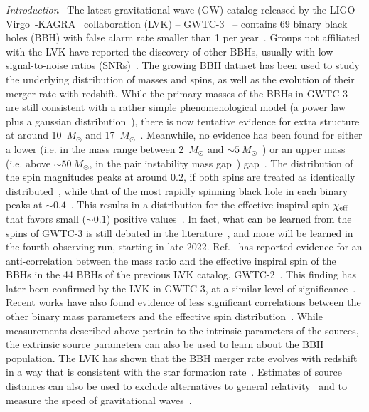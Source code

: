 \documentclass[floats,floatfix,showpacs,amssymb,prl,twocolumn,superscriptaddress,nofootinbib]{revtex4-2}
\newcommand{\msun}{\ensuremath{M_{\odot}}\xspace}
\newcommand\prlsec[1]{\vspace{2mm}\noindent \emph{#1}--}
\newcommand{\catalog}{GWTC-3\xspace}
\begin{document}
\maketitle
\prlsec{Introduction} The latest gravitational-wave (GW) catalog released by the LIGO~\cite{TheLIGOScientific:2014jea}-Virgo~\cite{TheVirgo:2014hva}-KAGRA~\cite{Somiya:2011np, Aso:2013eba, Akutsu:2017kpk} collaboration (LVK) -- GWTC-3~\cite{LIGOScientific:2021djp} -- contains 69 binary black holes (BBH) with false alarm rate smaller than 1 per year~\cite{LIGOScientific:2021psn}. Groups not affiliated with the LVK have reported the discovery of other BBHs, usually with low signal-to-noise ratios (SNRs)~\cite{Nitz:2021zwj,Olsen:2022pin}.
The growing BBH dataset has been used to study the underlying distribution of masses and spins, as well as the evolution of their merger rate with redshift. 
While the primary masses of the BBHs in \catalog are still consistent with a rather simple phenomenological model (a power law plus a gaussian distribution~\cite{Talbot:2018cva}), there is now tentative evidence for extra structure at around 10~\msun and 17~\msun~\cite{Tiwari:2020otp, Edelman:2021zkw, Li:2021ukd, Veske:2021qis, LIGOScientific:2021psn}. Meanwhile, no evidence has been found for either a lower (i.e. in the mass range between $2$~\msun and $\sim 5~\msun$~\cite{2010ApJ...725.1918O,2011ApJ...741..103F}) or an upper mass (i.e. above $\sim 50~\msun$, in the pair instability mass gap~\cite{Fryer:2000my}) gap~\cite{Farah:2021qom}. The distribution of the spin magnitudes peaks at around $0.2$, if both spins are treated as identically distributed~\cite{Wysocki:2018, LIGOScientific:2021psn}, while that of the most rapidly spinning black hole in each binary peaks at $\sim 0.4$~\cite{Biscoveanu:2020are}. This results in a distribution for the effective inspiral spin $\chi_{\rm{eff}}$ that favors small ($\sim 0.1$) positive values~\cite{Miller:2020zox, LIGOScientific:2021psn}. In fact, what can be learned from the spins of \catalog is still debated in the literature~\cite{Roulet:2021hcu,Galaudage:2021rkt,Miller:2020zox}, and more will be learned in the fourth observing run, starting in late 2022. Ref.~\cite{Callister:2021fpo} has reported evidence for an anti-correlation between the mass ratio and the effective inspiral spin of the BBHs in the {44} BBHs of the previous LVK catalog, GWTC-2~\cite{LIGOScientific:2020ibl}. This finding has later been confirmed by the LVK in \catalog, at a similar level of significance~\cite{LIGOScientific:2021psn}. Recent works have also found evidence of less significant correlations between the other binary mass parameters and the effective spin distribution~\cite{Safarzadeh:2020mlb, Franciolini:2022iaa,2021arXiv211013542H}.
While measurements described above pertain to the intrinsic parameters of the sources, the extrinsic source parameters can also be used to learn about the BBH population. The LVK has shown that the BBH merger rate evolves with redshift in a way that is consistent with the star formation rate~\cite{LIGOScientific:2021psn}. Estimates of source distances can also be used to exclude alternatives to general relativity~\cite{Pardo:2018ipy} and to measure the speed of gravitational waves~\cite{LIGOScientific:2017zic}.
\end{document}
